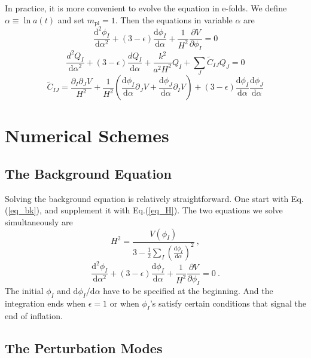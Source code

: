 \documentclass[11pt]{article}
\newcommand{\mpl}{m_{\mathrm{pl}}}
\newcommand{\ud}{\mathrm{d}}
\newcommand{\pd}{\partial}
\def\tilC{{\tilde C}}
\begin{document}
In practice, it is more convenient to evolve the equation in e-folds. We define $\alpha \equiv \ln a(t)$ and set $\mpl = 1$. 
Then the equations in variable $\alpha$ are 
\begin{equation}\label{eq_bk}
\frac{\ud^2 \phi_I}{\ud \alpha^2 } + (3 -\epsilon) \frac{\ud \phi_I}{\ud \alpha} + \frac{1}{H^2}\frac{\pd V}{\pd \phi_I} = 0  
\end{equation}
\begin{equation}
\frac{d^2 Q_I}{\ud \alpha^2} + (3-\epsilon) \frac{d Q_I}{\ud \alpha} + \frac{k^2}{a^2H^2} Q_I + \sum_J \tilC_{IJ} Q_J = 0
\end{equation}
\begin{equation}\label{cij}
\tilC_{IJ} = \frac{\pd_I\pd_J V}{H^2} + \frac{1}{H^2} \left(\frac{\ud \phi_I}{\ud \alpha} \pd_J V  +  \frac{\ud \phi_J}{\ud \alpha} \pd_I V \right)
+ (3-\epsilon) \frac{\ud \phi_I}{\ud \alpha} \frac{\ud \phi_J}{\ud \alpha}
\end{equation}

\section{Numerical Schemes}

\subsection{The Background Equation}

Solving the background equation is relatively straightforward. One start with Eq.(\ref{eq_bk}), and supplement it with Eq.(\ref{eq_H}). The two equations we solve simultaneously are 
\begin{equation}
H^2 = \frac{V(\phi_I)}{3 - \frac{1}{2}\sum_I \left(\frac{\ud \phi_I}{\ud \alpha}\right)^2} ~,
\end{equation}
\begin{equation}
\frac{\ud^2 \phi_I}{\ud \alpha^2 } + (3 -\epsilon) \frac{\ud \phi_I}{\ud \alpha} + \frac{1}{H^2}\frac{\pd V}{\pd \phi_I} = 0  ~.
\end{equation}
The initial $\phi_I$ and $\ud \phi_I/\ud \alpha$ have to be specified at the beginning. And the integration ends when $\epsilon = 1$ or when $\phi_I$'s satisfy certain conditions that signal the end of inflation. 

\subsection{The Perturbation Modes}
\end{document}
